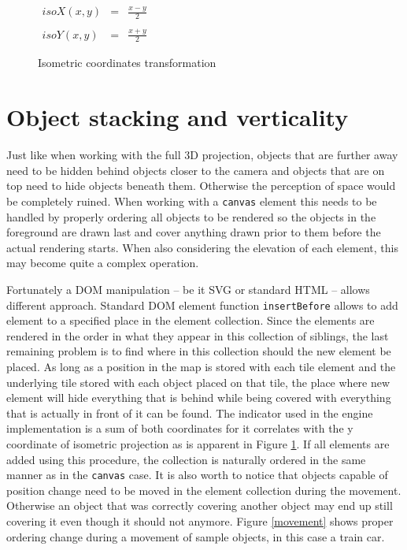 \documentclass[11pt,oneside, final]{fithesis2}
\begin{document}
\begin{figure}[h]
	\centering
	\begin{math}
		\begin{array}{lcl}
			isoX(x,y)&=&\frac{x - y}{2} \\\\
			isoY(x,y)&=&\frac{x + y}{2}
		\end{array}
	\end{math}
	\caption{Isometric coordinates transformation}
	\label{isotransformation}
\end{figure}

\section{Object stacking and verticality}
Just like when working with the full 3D projection, objects that are further away need to be hidden behind objects closer to the camera and objects that are on top need to hide objects beneath them. Otherwise the perception of space would be completely ruined. When working with a \texttt{canvas} element this needs to be handled by properly ordering all objects to be rendered so the objects in the foreground are drawn last and cover anything drawn prior to them before the actual rendering starts. When also considering the elevation of each element, this may become quite a complex operation. 

Fortunately a DOM manipulation -- be it SVG or standard HTML -- allows different approach. Standard DOM element function \texttt{insertBefore} allows to add element to a specified place in the element collection\cite{insertbefore}. Since the elements are rendered in the order in what they appear in this collection of siblings, the last remaining problem is to find where in this collection should the new element be placed. As long as a position in the map is stored with each tile element and the underlying tile stored with each object placed on that tile, the place where new element will hide everything that is behind while being covered with everything that is actually in front of it can be found. The indicator used in the engine implementation is a sum of both coordinates for it correlates with the y coordinate of isometric projection as is apparent in Figure \ref{isotransformation}. If all elements are added using this procedure, the collection is naturally ordered in the same manner as in the \texttt{canvas} case. It is also worth to notice that objects capable of position change need to be moved in the element collection during the movement. Otherwise an object that was correctly covering another object may end up still covering it even though it should not anymore. Figure \ref{movement} shows proper ordering change during a movement of sample objects, in this case a train car.
\end{document}

